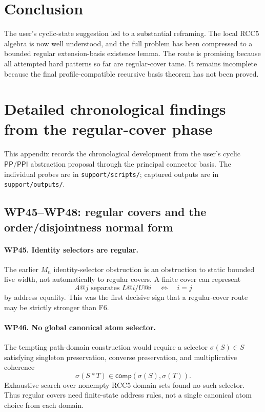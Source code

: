 \documentclass[11pt]{article}
\newcommand{\PP}{\mathsf{PP}}
\newcommand{\PPI}{\mathsf{PPI}}
\newcommand{\comp}{\mathsf{comp}}
\begin{document}
\section{Conclusion}

The user's cyclic-state suggestion led to a substantial reframing. The local RCC5 algebra is now well understood, and the full problem has been compressed to a bounded regular extension-basis existence lemma. The route is promising because all attempted hard patterns so far are regular-cover tame. It remains incomplete because the final profile-compatible recursive basis theorem has not been proved.


\appendix
\section{Detailed chronological findings from the regular-cover phase}
This appendix records the chronological development from the user's cyclic $\PP/\PPI$ abstraction proposal through the principal connector basis.  The individual probes are in \texttt{support/scripts/}; captured outputs are in \texttt{support/outputs/}.

\subsection{WP45--WP48: regular covers and the order/disjointness normal form}
\paragraph{WP45. Identity selectors are regular.}
The earlier $M_n$ identity-selector obstruction is an obstruction to static bounded live width, not automatically to regular covers.  A finite cover can represent
\[
A@j\text{ separates }L@i/U@i \quad\Longleftrightarrow\quad i=j
\]
by address equality.  This was the first decisive sign that a regular-cover route may be strictly stronger than F6.

\paragraph{WP46. No global canonical atom selector.}
The tempting path-domain construction would require a selector $\sigma(S)\in S$ satisfying singleton preservation, converse preservation, and multiplicative coherence
\[
\sigma(S*T)\in \comp(\sigma(S),\sigma(T)).
\]
Exhaustive search over nonempty RCC5 domain sets found no such selector.  Thus regular covers need finite-state address rules, not a single canonical atom choice from each domain.
\end{document}
